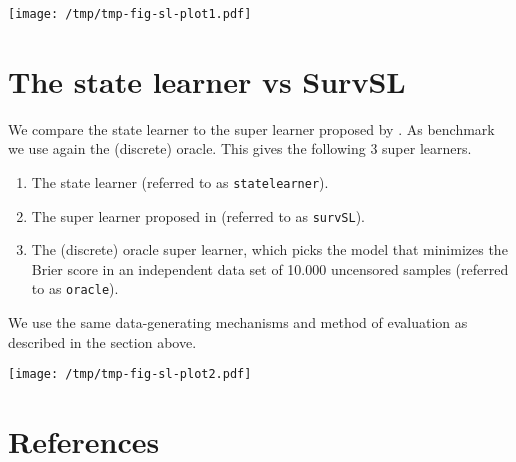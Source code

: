 \documentclass[a4paper,danish]{article}
\begin{document}
\begin{center}
\texttt{[image: /tmp/tmp-fig-sl-plot1.pdf]}
\end{center}

\clearpage 


\section{The state learner vs SurvSL}
\label{sec:orgd930776}

We compare the state learner to the super learner proposed by
\cite{westling2021inference}. As benchmark we use again the (discrete) oracle.
This gives the following 3 super learners.


\begin{enumerate}
\item The state learner (referred to as \texttt{statelearner}).
\item The super learner proposed in \citep{westling2021inference} (referred to as
\texttt{survSL}).
\item The (discrete) oracle super learner, which picks the model that minimizes the
Brier score in an independent data set of 10.000 uncensored samples (referred to
as \texttt{oracle}).
\end{enumerate}

We use the same data-generating mechanisms and method of evaluation as described
in the section above.

\begin{center}
\texttt{[image: /tmp/tmp-fig-sl-plot2.pdf]}
\end{center}




\section{References}
\label{sec:orgb7dc71d}
\renewcommand{\section}[2]{} 

\end{document}
